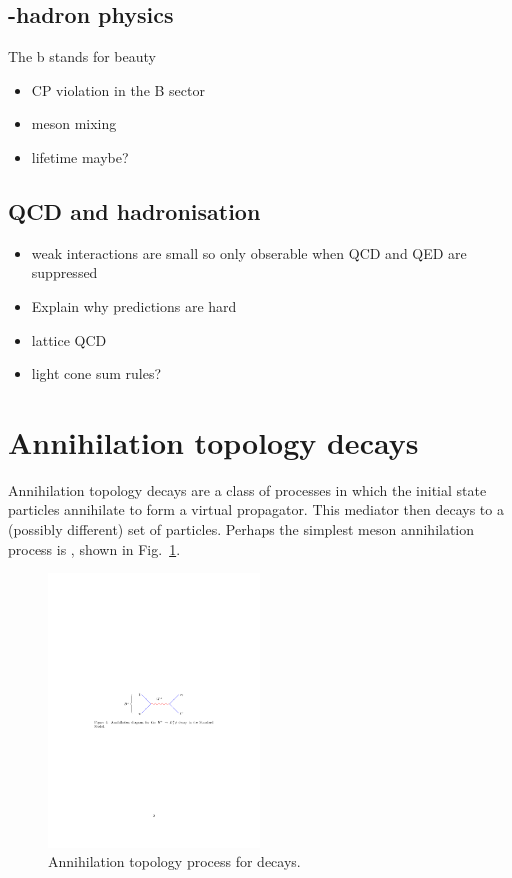 \subsection{\bquark-hadron physics}
The b stands for beauty
{\color{Red}
\begin{itemize}
\item CP violation in the B sector
\item \B meson mixing
\item lifetime maybe? 
\end{itemize}}

\subsection{QCD and hadronisation}
{\color{Red}
\begin{itemize}
\item weak interactions are small so only obserable when QCD and QED are suppressed
\item Explain why predictions are hard
\item lattice QCD
\item light cone sum rules? 
\end{itemize}}

\section{Annihilation topology decays}

Annihilation topology decays are a class of processes in which the initial state particles annihilate to form a virtual propagator. This mediator then decays to a (possibly different) set of particles.
Perhaps the simplest \Bp meson annihilation process is \decay{\Bp}{\ellp\neul}, shown in Fig.~\ref{fig:Theory_B2ellnu}. 
\begin{figure}[!h]
    \centering
        \centering
        \includegraphics[width=0.5\textwidth]{figs/Theory/B2ellnu.pdf}
    \caption{Annihilation topology process for \decay{\Bp}{\ellp\neul} decays.}
    \label{fig:Theory_B2ellnu}   
\end{figure}

